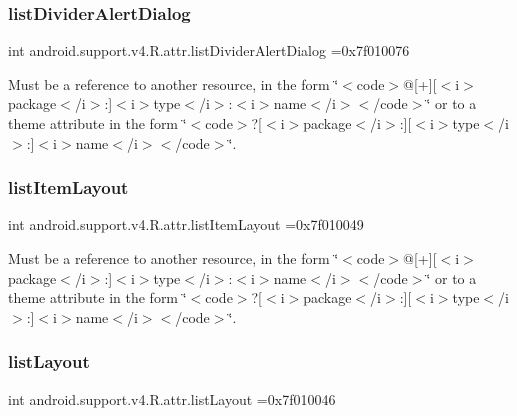 \subsubsection{\texorpdfstring{list\+Divider\+Alert\+Dialog}{listDividerAlertDialog}}
{\footnotesize\ttfamily int android.\+support.\+v4.\+R.\+attr.\+list\+Divider\+Alert\+Dialog =0x7f010076\hspace{0.3cm}{\ttfamily [static]}}

Must be a reference to another resource, in the form \char`\"{}$<$code$>$@\mbox{[}+\mbox{]}\mbox{[}$<$i$>$package$<$/i$>$\+:\mbox{]}$<$i$>$type$<$/i$>$\+:$<$i$>$name$<$/i$>$$<$/code$>$\char`\"{} or to a theme attribute in the form \char`\"{}$<$code$>$?\mbox{[}$<$i$>$package$<$/i$>$\+:\mbox{]}\mbox{[}$<$i$>$type$<$/i$>$\+:\mbox{]}$<$i$>$name$<$/i$>$$<$/code$>$\char`\"{}. \mbox{\label{classandroid_1_1support_1_1v4_1_1R_1_1attr_ac152e1975a0059d413c9b97ed9841b7b}} 
\subsubsection{\texorpdfstring{list\+Item\+Layout}{listItemLayout}}
{\footnotesize\ttfamily int android.\+support.\+v4.\+R.\+attr.\+list\+Item\+Layout =0x7f010049\hspace{0.3cm}{\ttfamily [static]}}

Must be a reference to another resource, in the form \char`\"{}$<$code$>$@\mbox{[}+\mbox{]}\mbox{[}$<$i$>$package$<$/i$>$\+:\mbox{]}$<$i$>$type$<$/i$>$\+:$<$i$>$name$<$/i$>$$<$/code$>$\char`\"{} or to a theme attribute in the form \char`\"{}$<$code$>$?\mbox{[}$<$i$>$package$<$/i$>$\+:\mbox{]}\mbox{[}$<$i$>$type$<$/i$>$\+:\mbox{]}$<$i$>$name$<$/i$>$$<$/code$>$\char`\"{}. \mbox{\label{classandroid_1_1support_1_1v4_1_1R_1_1attr_aaa4f60da265ec9c98e41d06c2da774fc}} 
\subsubsection{\texorpdfstring{list\+Layout}{listLayout}}
{\footnotesize\ttfamily int android.\+support.\+v4.\+R.\+attr.\+list\+Layout =0x7f010046\hspace{0.3cm}{\ttfamily [static]}}

